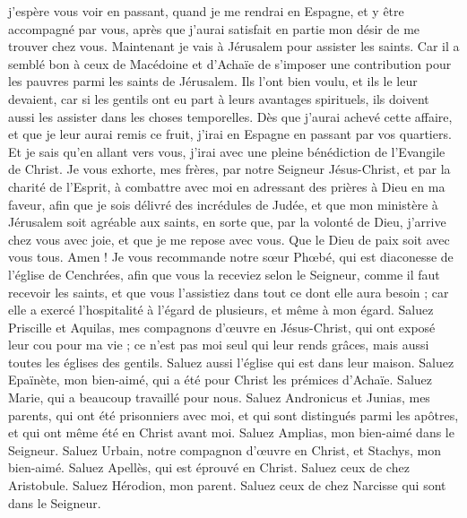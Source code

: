 \begin{multicols}{2}
j’espère vous voir en passant, quand je me rendrai en Espagne, et y être accompagné par vous, après que j’aurai satisfait en partie mon désir de me trouver chez vous.
Maintenant je vais à Jérusalem pour assister les saints.
Car il a semblé bon à ceux de Macédoine et d’Achaïe de s’imposer une contribution pour les pauvres parmi les saints de Jérusalem.
Ils l’ont bien voulu, et ils le leur devaient, car si les gentils ont eu part à leurs avantages spirituels, ils doivent aussi les assister dans les choses temporelles.
Dès que j'aurai achevé cette affaire, et que je leur aurai remis ce fruit, j'irai en Espagne en passant par vos quartiers.
Et je sais qu’en allant vers vous, j’irai avec une pleine bénédiction de l'Evangile de Christ.
Je vous exhorte, mes frères, par notre Seigneur Jésus-Christ, et par la charité de l'Esprit, à combattre avec moi en adressant des prières à Dieu en ma faveur,
afin que je sois délivré des incrédules de Judée, et que mon ministère à Jérusalem soit agréable aux saints,
en sorte que, par la volonté de Dieu, j’arrive chez vous avec joie, et que je me repose avec vous.
Que le Dieu de paix soit avec vous tous. Amen !
\VerseOne{}Je vous recommande notre sœur Phœbé, qui est diaconesse de l'église de Cenchrées,
afin que vous la receviez selon le Seigneur, comme il faut recevoir les saints, et que vous l'assistiez dans tout ce dont elle aura besoin ; car elle a exercé l'hospitalité à l'égard de plusieurs, et même à mon égard.
Saluez Priscille et Aquilas, mes compagnons d’œuvre en Jésus-Christ,
qui ont exposé leur cou pour ma vie ; ce n’est pas moi seul qui leur rends grâces, mais aussi toutes les églises des gentils.
Saluez aussi l'église qui est dans leur maison. Saluez Epaïnète, mon bien-aimé, qui a été pour Christ les prémices d'Achaïe.
Saluez Marie, qui a beaucoup travaillé pour nous.
Saluez Andronicus et Junias, mes parents, qui ont été prisonniers avec moi, et qui sont distingués parmi les apôtres, et qui ont même été en Christ avant moi.
Saluez Amplias, mon bien-aimé dans le Seigneur.
Saluez Urbain, notre compagnon d’œuvre en Christ, et Stachys, mon bien-aimé.
Saluez Apellès, qui est éprouvé en Christ. Saluez ceux de chez Aristobule.
Saluez Hérodion, mon parent. Saluez ceux de chez Narcisse qui sont dans le Seigneur.

\end{multicols}
